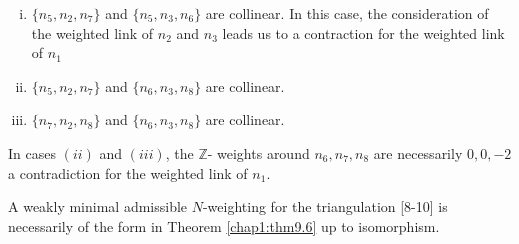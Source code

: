 \begin{enumerate}[(i)]
\item $\{ n_5, n_2, n_7 \}$ and $\{ n_5, n_3, n_6 \}$ are collinear.
  In this case, the consideration of the weighted link of $n_2$ and
  $n_3$ leads us to a contraction for the weighted link of $n_1$  

\item $\{ n_5, n_2, n_7 \}$ and $\{ n_6, n_3, n_8 \}$ are collinear.

\item $\{ n_7, n_2, n_8 \}$ and $\{ n_6, n_3, n_8 \}$ are collinear.
\end{enumerate}

\noindent
In cases $(ii)$ and $(iii)$, the $\mathbb{Z}$- weights around $n_6,
n_7,n_8$ are necessarily $0, 0, -2$ a contradiction for the weighted
link of $n_1$. 

\begin{lemma}\label{chap1:lem9.17}
A weakly minimal admissible $N$-weighting for the triangulation [8-10]
is necessarily of the form in Theorem \ref{chap1:thm9.6} up to isomorphism. 
\end{lemma}

